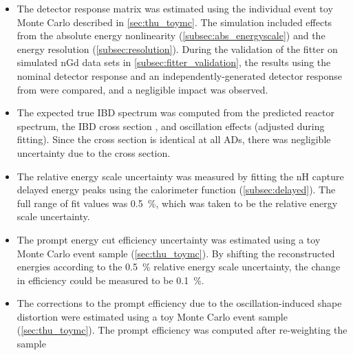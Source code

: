 \begin{itemize}
    \item The detector response matrix was estimated using the
        individual event toy Monte Carlo described in \cref{sec:thu_toymc}.
        The simulation included effects from
        the absolute energy nonlinearity (\cref{subsec:abs_energyscale})
        and the energy resolution (\cref{subsec:resolution}).
        During the validation of the fitter on simulated nGd data sets
        in \cref{subsec:fitter_validation},
        the results using the nominal detector response
        and an independently-generated detector response from \cite{lbnl_toymc}
        were compared, and a negligible impact was observed.
    \item The expected true IBD spectrum was computed from
        the predicted reactor spectrum,
        the IBD cross section \cite{ibd_xsec},
        and oscillation effects (adjusted during fitting).
        Since the cross section is identical at all ADs,
        there was negligible uncertainty due to the cross section.
    \item The relative energy scale uncertainty was measured
        by fitting the nH capture delayed energy peaks
        using the calorimeter function (\cref{subsec:delayed}).
        The full range of fit values was \SI{0.5}{\percent},
        which was taken to be the relative energy scale uncertainty.
    \item The prompt energy cut efficiency uncertainty
        was estimated using a toy Monte Carlo event sample (\cref{sec:thu_toymc}).
        By shifting the reconstructed energies according to the
        \SI{0.5}{\percent} relative energy scale uncertainty,
        the change in efficiency could be measured to be \SI{0.1}{\percent}.
    \item The corrections to the prompt efficiency
        due to the oscillation-induced shape distortion
        were estimated using a toy Monte Carlo event sample (\cref{sec:thu_toymc}).
        The prompt efficiency was computed after re-weighting the sample

\end{itemize}
